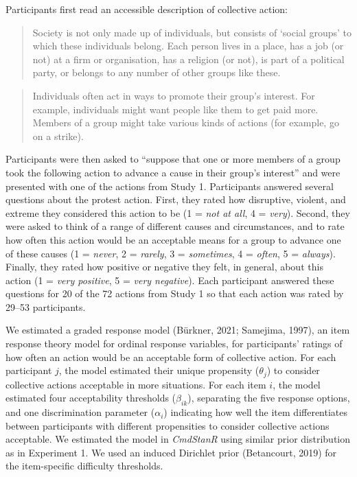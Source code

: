 \documentclass[12pt, letterpaper]{article}
\begin{document}
Participants first read an accessible description of collective action:

\begin{quote}
Society is not only made up of individuals, but consists of `social
groups' to which these individuals belong. Each person lives in a place,
has a job (or not) at a firm or organisation, has a religion (or not),
is part of a political party, or belongs to any number of other groups
like these.
\end{quote}

\begin{quote}
Individuals often act in ways to promote their group's interest. For
example, individuals might want people like them to get paid more.
Members of a group might take various kinds of actions (for example, go
on a strike).
\end{quote}

\noindent Participants were then asked to ``suppose that one or more
members of a group took the following action to advance a cause in their
group's interest'' and were presented with one of the actions from Study
1. Participants answered several questions about the protest action.
First, they rated how disruptive, violent, and extreme they considered
this action to be (1 = \emph{not at all}, 4 = \emph{very}). Second, they
were asked to think of a range of different causes and circumstances,
and to rate how often this action would be an acceptable means for a
group to advance one of these causes (1 = \emph{never}, 2 =
\emph{rarely}, 3 = \emph{sometimes}, 4 = \emph{often}, 5 =
\emph{always}). Finally, they rated how positive or negative they felt,
in general, about this action (1 = \emph{very positive}, 5 = \emph{very
negative}). Each participant answered these questions for 20 of the 72
actions from Study 1 so that each action was rated by 29--53
participants.

We estimated a graded response model (Bürkner, 2021; Samejima, 1997), an
item response theory model for ordinal response variables, for
participants' ratings of how often an action would be an acceptable form
of collective action. For each participant \(j\), the model estimated
their unique propensity (\(\theta_j\)) to consider collective actions
acceptable in more situations. For each item \(i\), the model estimated
four acceptability thresholds (\(\beta_{ik}\)), separating the five
response options, and one discrimination parameter (\(\alpha_i\))
indicating how well the item differentiates between participants with
different propensities to consider collective actions acceptable. We
estimated the model in \emph{CmdStanR} using similar prior distribution
as in Experiment 1. We used an induced Dirichlet prior (Betancourt,
2019) for the item-specific difficulty thresholds.
\end{document}
